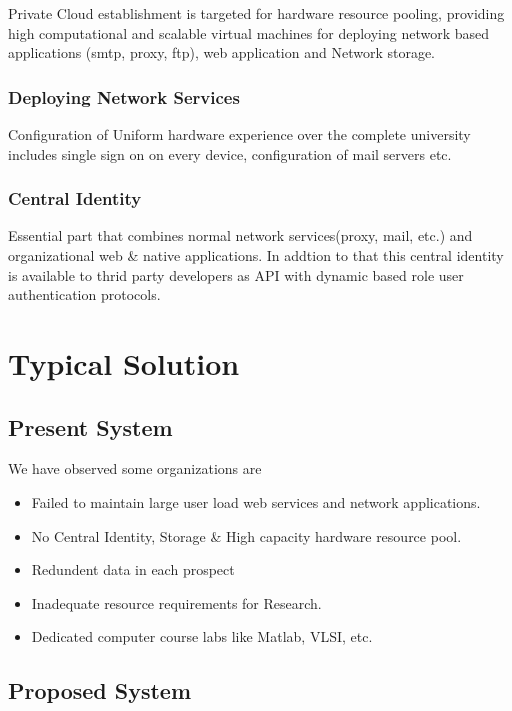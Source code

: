 \documentclass[12pt]{report}
\begin{document}
	Private Cloud establishment is targeted for hardware resource pooling, providing high computational and scalable virtual machines for deploying network based applications (smtp, proxy, ftp), web application and Network storage.
	
\subsection{Deploying Network Services}

	Configuration of Uniform hardware experience over the complete university includes single sign on on every device, configuration of mail servers etc.
	
\subsection{Central Identity}

	Essential part that combines normal network services(proxy, mail, etc.) and organizational web \& native applications. In addtion to that this central identity is available to thrid party developers as API with dynamic based role user authentication protocols.	
	

\chapter{Typical Solution}

\section{Present System}

	We have observed some organizations are 
	\begin{itemize}
		\item Failed to maintain large user load web services  and network applications.
		\item No Central Identity, Storage \& High capacity hardware resource pool.
		\item Redundent data in each prospect
		\item Inadequate resource requirements for Research.
		\item Dedicated computer course labs like Matlab, VLSI, etc. 
	\end{itemize}

\section{Proposed System}
\end{document}
